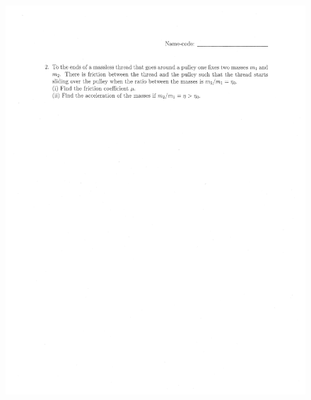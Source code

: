\documentclass[10pt,a4paper]{article}
\begin{document}
\begin{figure}[H]
 \centering
 \includegraphics[width=16cm]{pdf/1-1T51.png}
\end{figure}
 \newpage
\end{document}
